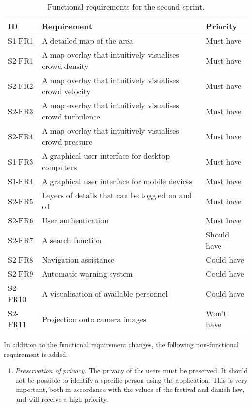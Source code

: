 \begin{table}[htbp]
	\centering
	\begin{tabularx}{\textwidth}{lXl}
		\toprule
		\textbf{ID} & \textbf{Requirement} & \textbf{Priority} \\
		\midrule 
		\rowcolor[HTML]{EFEFEF} 
		S1-FR1 & A detailed map of the area & Must have \\
		S2-FR1 & A map overlay that intuitively visualises crowd density & Must have \\
		\rowcolor[HTML]{EFEFEF} 
		S2-FR2 & A map overlay that intuitively visualises crowd velocity & Must have \\
		S2-FR3 & A map overlay that intuitively visualises crowd turbulence & Must have \\
		\rowcolor[HTML]{EFEFEF} 
		S2-FR4 & A map overlay that intuitively visualises crowd pressure & Must have \\
		S1-FR3 & A graphical user interface for desktop computers & Must have \\
		\rowcolor[HTML]{EFEFEF} 
		S1-FR4 & A graphical user interface for mobile devices & Must have \\
		S2-FR5 & Layers of details that can be toggled on and off & Must have \\
		\rowcolor[HTML]{EFEFEF} 
		S2-FR6 & User authentication & Must have \\
		S2-FR7 & A search function & Should have \\
		\rowcolor[HTML]{EFEFEF} 
		S2-FR8 & Navigation assistance & Could have \\
		S2-FR9 & Automatic warning system & Could have \\
		\rowcolor[HTML]{EFEFEF} 
		S2-FR10 & A visualisation of available personnel & Could have \\
		S2-FR11 & Projection onto camera images & Won't have \\
		\bottomrule
	\end{tabularx}
	\caption{Functional requirements for the second sprint.}
	\label{tab:s2_req}
\end{table}

In addition to the functional requirement changes, the following non-functional requirement is added.

\begin{enumerate}
    \item \emph{Preservation of privacy.} The privacy of the users must be preserved. It should not be possible to identify a specific person using the application. This is very important, both in accordance with the values of the festival and danish law, and will receive a high priority.
\end{enumerate}

